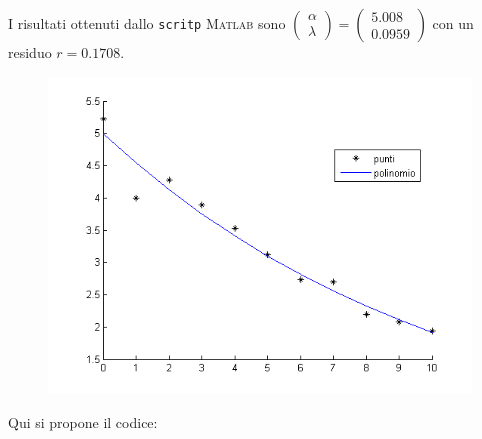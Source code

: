 \begin{sol}
	I risultati ottenuti dallo \lstinline{scritp} \textsc{Matlab} sono $\begin{pmatrix}\alpha\\\lambda\end{pmatrix}=\begin{pmatrix}5.008\\0.0959\end{pmatrix}$ con un residuo $r=0.1708$. \centering\begin{figure}[H]\includegraphics[scale=0.60]{img/es4_22.png}\end{figure}
	Qui si propone il codice:\\
	
\end{sol}
